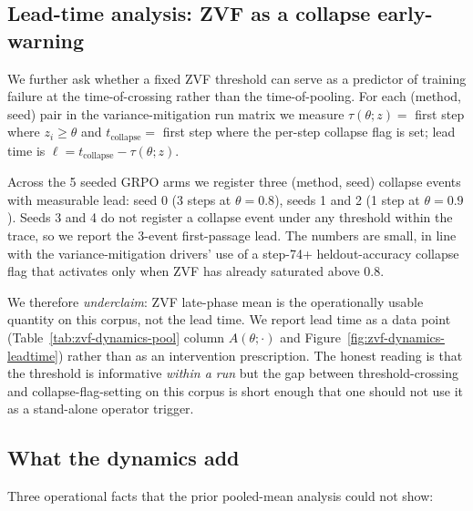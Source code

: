 \documentclass{article}
\begin{document}
\subsection{Lead-time analysis: ZVF as a collapse early-warning}

We further ask whether a fixed ZVF threshold can serve as a
predictor of training failure at the time-of-crossing rather than
the time-of-pooling. For each (method, seed) pair in the
variance-mitigation run matrix we measure
$\tau(\theta; z) = $ first step where $z_i \ge \theta$ and
$t_{\text{collapse}} = $ first step where the per-step collapse flag
is set; lead time is $\ell = t_{\text{collapse}} - \tau(\theta; z)$.

Across the 5 seeded GRPO arms we register three (method, seed)
collapse events with measurable lead: seed 0 (3 steps at $\theta=0.8$),
seeds 1 and 2 (1 step at $\theta=0.9$). Seeds 3 and 4 do not register
a collapse event under any threshold within the trace, so we report
the 3-event first-passage lead. The numbers are small, in line with
the variance-mitigation drivers' use of a step-74+ heldout-accuracy
collapse flag that activates only when ZVF has already saturated
above 0.8.

We therefore \emph{underclaim}: ZVF late-phase mean is the
operationally usable quantity on this corpus, not the lead time. We
report lead time as a data point (Table~\ref{tab:zvf-dynamics-pool}
column $A(\theta;\cdot)$ and Figure~\ref{fig:zvf-dynamics-leadtime})
rather than as an intervention prescription. The honest reading is
that the threshold is informative \emph{within a run} but the
gap between threshold-crossing and collapse-flag-setting on this
corpus is short enough that one should not use it as a stand-alone
operator trigger.

\subsection{What the dynamics add}

Three operational facts that the prior pooled-mean analysis could
not show:
\end{document}
